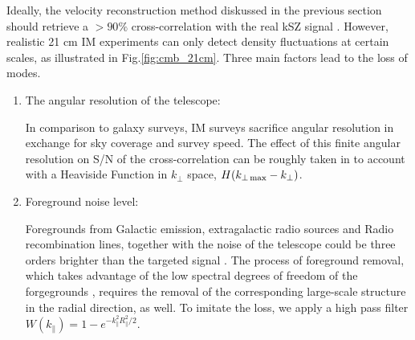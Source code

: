 \label{sec:21cm}
Ideally, the velocity reconstruction method diskussed in the previous section should retrieve a $>90\%$ cross-correlation with the real kSZ signal \cite{Shao11}. However, realistic 21 cm IM experiments can only detect density fluctuations at certain scales, as illustrated in Fig.\ref{fig:cmb_21cm}. Three main factors lead to the loss of modes. 
\begin{enumerate}
\item The angular resolution of the telescope:
 
In comparison to galaxy surveys, IM surveys sacrifice angular resolution in exchange for sky coverage and survey speed. The effect of this finite angular resolution on S/N of the cross-correlation can be roughly taken in to account with a Heaviside Function in $k_\perp$ space, $H(k_{\perp\,\mathrm{max}}-k_\perp)$.

\item Foreground noise level:

Foregrounds from Galactic emission, extragalactic radio sources and Radio recombination lines, together with the noise of the telescope could be three orders brighter than the targeted signal \cite{DiMatteo04,Masui13}. The process of foreground removal, which takes advantage of the low spectral degrees of freedom of the forgegrounds \cite{Switzer15}, requires the removal of the corresponding large-scale structure in the radial direction, as well. To imitate the loss, we apply a high pass filter $W(k_\parallel)=1-e^{-k_\parallel^2R_\parallel^2/2}$.


\end{enumerate}
